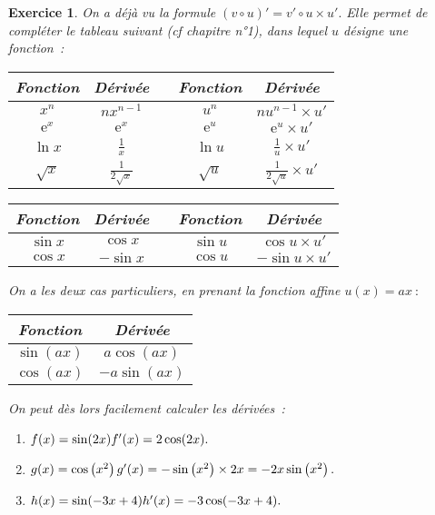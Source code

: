 \documentclass[10pt]{article}
\newtheorem{exo}{Exercice}
\begin{document}
\begin{exo}

On a déjà vu la formule $(v\circ u)'=v'\circ u \times u'.$ Elle permet de compléter le tableau suivant (cf chapitre n°1), dans lequel $u$ désigne une fonction~:

\begin{center}
\renewcommand{\arraystretch}{1.5}
\begin{tabular}{|c|c|c|c|c|} \hline
\textbf{Fonction}& \textbf{Dérivée}&\cellcolor{black}&\textbf{Fonction}& \textbf{Dérivée}\\ \hline
$x^n$&$nx^{n-1}$&\cellcolor{black}&$u^n$&$n u^{n-1}\times u'$\\ \hline
$\text{e}^x$&$\text{e}^x$&\cellcolor{black}&$\text{e}^u$&$\text{e}^u\times u'$\\ \hline
$\ln x$&$\frac{1}{x}$&\cellcolor{black}&$\ln u$&$\frac{1}{u}\times u'$\\ \hline
$\sqrt{x}$&$\frac{1}{2\sqrt{x}}$&\cellcolor{black}&$\sqrt{u}$&$\frac{1}{2\sqrt{u}}\times u'$ \\ \hline
\end{tabular}
\end{center}

\medskip

\begin{center}
\renewcommand{\arraystretch}{1.5}
\begin{tabular}{|c|c|c|c|c|} \hline
\textbf{Fonction}& \textbf{Dérivée}&\cellcolor{black}&\textbf{Fonction}& \textbf{Dérivée}\\ \hline
$\sin x$&$\cos x$&\cellcolor{black}&$\sin u$&$\cos u\times u'$\\ \hline
$\cos x$&$-\sin x$&\cellcolor{black}&$\cos u$&$-\sin u\times u'$\\ \hline
\end{tabular}
\end{center}

\medskip

On a les deux cas particuliers, en prenant la fonction affine $u(x)=ax~:$

\begin{center}
\renewcommand{\arraystretch}{1.5}
\begin{tabular}{|c|c|} \hline
\textbf{Fonction}& \textbf{Dérivée}\\ \hline
$\sin (ax)$&$a\cos (ax)$\\ \hline
$\cos (ax)$&$-a\sin (ax)$ \\ \hline
\end{tabular}
\end{center}

\medskip

On peut dès lors facilement calculer les dérivées~:


\begin{enumerate}
\item $f(x)=\sin(2x)\hfill f'(x)=2\cos(2x).$
\item $g(x)=\cos\left(x^2\right)\hfill g'(x)=-\sin\left(x^2\right)\times 2x=-2x\sin\left(x^2\right).$
\item $h(x)=\sin(-3x+4)\hfill h'(x)=-3\cos(-3x+4).$
\end{enumerate}


\end{exo}
\end{document}
